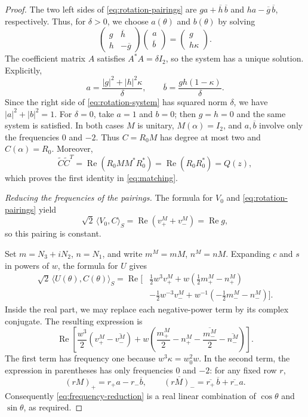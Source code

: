 \begin{proof}
The two left sides of \eqref{eq:rotation-pairings} are
$ga+\overline h\,\overline b$ and
$ha-\overline g\,\overline b$, respectively.  Thus, for $\delta>0$,
we choose $a(\theta)$ and $b(\theta)$ by solving
\begin{equation}\label{eq:rotation-system}
 \begin{pmatrix}g&\overline h\\h&-\overline g\end{pmatrix}
 \begin{pmatrix}a\\\overline b\end{pmatrix}
 =\begin{pmatrix}g\\h\kappa\end{pmatrix}.
\end{equation}
The coefficient matrix $A$ satisfies $A^*A=\delta I_2$, so the
system has a unique solution.  Explicitly,
\begin{equation}\label{eq:rotation-coefficients}
 a=\frac{|g|^2+|h|^2\kappa}{\delta},\qquad
 \overline b=\frac{gh(1-\kappa)}{\delta}.
\end{equation}
Since the right side of \eqref{eq:rotation-system} has squared norm
$\delta$, we have $|a|^2+|b|^2=1$.
For $\delta=0$, take $a=1$ and $b=0$; then $g=h=0$ and the same
system is satisfied.  In both cases $M$ is unitary,
$M(\alpha)=I_2$, and $a,\overline b$ involve only the
frequencies $0$ and $-2$.  Thus $C=R_0M$ has degree at most two and
$C(\alpha)=R_0$.  Moreover,
\[
 \widetilde C\widetilde C^T
 =\operatorname{Re}(R_0MM^*R_0^*)
 =\operatorname{Re}(R_0R_0^*)=Q(z),
\]
which proves the first identity in \eqref{eq:matching}.

\smallskip
\noindent\emph{Reducing the frequencies of the pairings.}
The formula for $V_0$ and \eqref{eq:rotation-pairings} yield
\[
 \sqrt2\,\langle V_0,C\rangle_S
 =\operatorname{Re}(v^M_++v^M_-)=\operatorname{Re}g,
\]
so this pairing is constant.

Set $m=N_3+iN_2$, $n=N_1$, and write $m^M=mM$, $n^M=nM$.
Expanding $c$ and $s$ in powers of $w$, the formula for $U$ gives
\begin{align*}
 \sqrt2\,\langle U(\theta),C(\theta)\rangle_S
 =\operatorname{Re}\bigl[{}
 &\tfrac12w^3v^M_+
 +w(\tfrac12m^M_+-n^M_+)\\
 &-\tfrac12w^{-3}v^M_-
 +w^{-1}(-\tfrac12m^M_--n^M_-)
 \bigr].
\end{align*}
Inside the real part, we may replace each negative-power term by its
complex conjugate.  The resulting expression is
\begin{equation}\label{eq:frequency-reduction}
 \operatorname{Re}\left[
 \frac{w^3}{2}(v^M_+-\overline{v^M_-})
 +w\left(\frac{m^M_+}{2}-n^M_+
          -\frac{\overline{m^M_-}}{2}-\overline{n^M_-}\right)
 \right].
\end{equation}
The first term has frequency one because
$w^3\kappa=w_0^2w$.  In the second term, the expression in parentheses
has only frequencies $0$ and $-2$: for any fixed row $r$,
\[
 (rM)_+=r_+a-r_-\overline b,
 \qquad
 \overline{(rM)_-}=\overline{r_+}\,\overline b+\overline{r_-}a.
\]
Consequently \eqref{eq:frequency-reduction} is a real linear
combination of $\cos\theta$ and $\sin\theta$, as required.


\end{proof}
